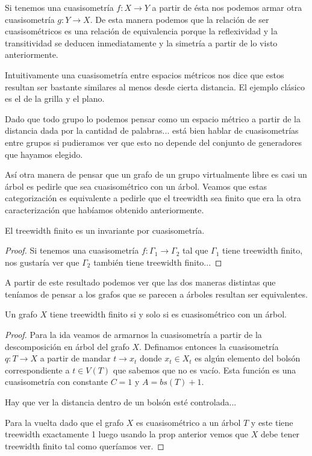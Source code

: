 \documentclass[tesis.tex]{subfiles}
\begin{document}
Si tenemos una cuasisometría $f:X \to Y$ a partir de ésta nos podemos armar otra cuasisometría $g:Y \to X$. De esta manera podemos que la relación de ser cuasisométricos es una relación de equivalencia porque la reflexividad y la transitividad se deducen inmediatamente y la simetría a partir de lo visto anteriormente.


Intuitivamente una cuasisometría entre espacios métricos nos dice que estos resultan ser bastante similares al menos desde cierta distancia. El ejemplo clásico es el de la grilla y el plano.

Dado que todo grupo lo podemos pensar como un espacio métrico a partir de la distancia dada por la cantidad de palabras... está bien hablar de cuasisometrías entre grupos si pudieramos ver que esto no depende del conjunto de generadores que hayamos elegido.



Así otra manera de pensar que un grafo de un grupo virtualmente libre es casi un árbol es pedirle que sea cuasisométrico con un árbol. Veamos que estas categorización es equivalente a pedirle que el treewidth sea finito que era la otra caracterización que habíamos obtenido anteriormente.

\begin{lema}
	El treewidth finito es un invariante por cuasisometría.
\end{lema}
\begin{proof}
Si tenemos una cuasisometría $f:\Gamma_1 \to \Gamma_2$ tal que $\Gamma_1$ tiene treewidth finito, nos gustaría ver que $\Gamma_2$ también tiene treewidth finito...
\end{proof}

A partir de este resultado podemos ver que las dos maneras distintas que teníamos de pensar a los grafos que se parecen a árboles resultan ser equivalentes.

\begin{prop}
	Un grafo $X$ tiene treewidth finito si y solo si es cuasisométrico con un árbol.
\end{prop}
\begin{proof}
	
Para la ida veamos de armarnos la cuasisometría a partir de la descomposición en árbol del grafo $X$. Definamos entonces la cuasisometría $q: T \to X$ a partir de mandar $t \to x_t$ donde $x_t \in X_t$ es algún elemento del bolsón correspondiente a $t \in V(T)$ que sabemos que no es vacío. Esta función es una cuasisometría con constante $C=1$ y $A = bs(T) + 1$.

Hay que ver la distancia dentro de un bolsón esté controlada...


Para la vuelta dado que el grafo $X$ es cuasisométrico a un árbol $T$ y este tiene treewidth exactamente 1 luego usando la prop anterior vemos que $X$ debe tener treewidth finito tal como queríamos ver.
\end{proof}
\end{document}

